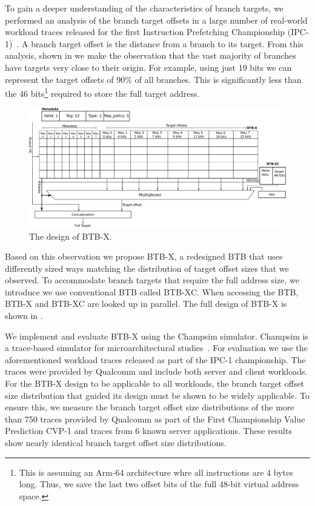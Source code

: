 \documentclass[../main.tex]{subfiles}
\begin{document}
\begin{refsection}
To gain a deeper understanding of the characteristics of branch
targets, we performed an analysis of the branch target offsets in a
large number of real-world workload traces released for the first
Instruction Prefetching Championship (IPC-1)~\cite{ipc1}. A branch
target offset is the distance from a branch to its target. From this
analysis, shown in  we make the observation
that the vast majority of branches have targets very close to their
origin. For example, using just 19 bits we can represent the target
offsets of 90\% of all branches. This is significantly less than the
46 bits\footnote{This is assuming an Arm-64 architecture whre all
  instructions are 4 bytes long. Thus, we save the last two offset
  bits of the full 48-bit virtual address space.} required to store
the full target address.

\begin{figure}[ht]
  \centering
  \includegraphics[width=\textwidth]{figures/BTB-X.pdf}
  \caption{\label{fig:btbx-design} The design of BTB-X.}
\end{figure}

Based on this observation we propose BTB-X, a redesigned BTB that uses
differently sized ways matching the distribution of target offset
sizes that we observed. To accommodate branch targets that require the
full address size, we introduce we use conventional BTB called
BTB-XC. When accessing the BTB, BTB-X and BTB-XC are looked up in
parallel. The full design of BTB-X is shown in .

We implement and evaluate BTB-X using the Champsim
simulator. Champsim is a trace-based simulator for microarchitectural
studies~\cite{champsim}. For evaluation we use the aforementioned
workload traces released as part of the IPC-1 championship. The traces
were provided by Qualcomm and include both server and client
workloads. For the BTB-X design to be applicable to all workloads, the
branch target offset size distribution that guided its design must be
shown to be widely applicable. To ensure this, we measure the branch
target offset size distributions of the more than 750 traces provided by
Qualcomm as part of the First Championship Value Prediction CVP-1 and
traces from 6 known server applications. These results show nearly
identical branch target offset size distributions.


\end{refsection}
\end{document}
